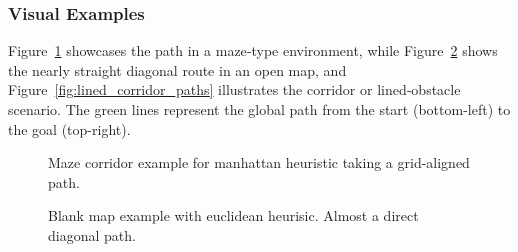 \documentclass[letterpaper, 10 pt, conference]{ieeeconf}
\begin{document}
\subsubsection{Visual Examples}
Figure~\ref{fig:maze_paths} showcases the path in a maze‐type environment, while Figure~\ref{fig:blank_paths} shows the nearly straight diagonal 
route in an open map, and Figure~\ref{fig:lined_corridor_paths} illustrates the corridor or lined‐obstacle scenario.
 The green lines represent the global path from the start (bottom-left) to the goal (top-right).

\begin{figure}[!ht]
    \centering
    \caption{Maze corridor example for manhattan heuristic taking a grid-aligned path.}
    \label{fig:maze_paths}
\end{figure}

\begin{figure}[!ht]
    \centering
    \caption{Blank map example with euclidean heurisic. Almost a direct diagonal path.}
    \label{fig:blank_paths}
\end{figure}
\end{document}
